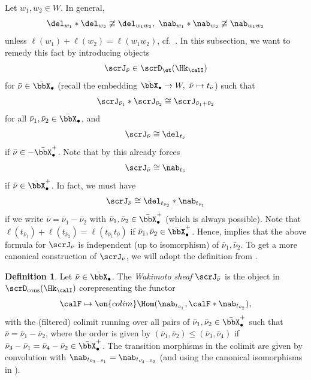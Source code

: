 \documentclass[10pt, reqno]{amsart}
\theoremstyle{plain}
\theoremstyle{definition}
\newtheorem{definition}[theorem]{Definition}
\numberwithin{equation}{section}
\begin{document}
	Let $w_1,w_2\in W$. In general,
	\begin{equation}
		\del_{w_1}\ast \del_{w_2}\ncong \del_{w_1w_2},\ \nab_{w_1}\ast \nab_{w_2}\ncong \nab_{w_1w_2}
	\end{equation}
	unless $\ell(w_1)+\ell(w_2)=\ell(w_1w_2)$, cf.\ . In this subsection, we want to remedy this fact by introducing objects
	\begin{equation}
		\scrJ_{\bar{\nu}}\in \scrD_{\et}(\Hk_{\calI})
	\end{equation}
	for $\bar{\nu}\in \bar{\bbX}_\bullet$ (recall the embedding $\bar{\bbX}_\bullet\to W,\ \bar{\nu}\mapsto t_{\bar{\nu}}$) such that
	\begin{equation}
		\scrJ_{\bar{\nu}_1}\ast \scrJ_{\bar{\nu}_2}\cong \scrJ_{\bar\nu_1+\bar\nu_2}
	\end{equation}
	for all $\bar\nu_1,\bar\nu_2\in \bar{\bbX}_\bullet$, and
	\begin{equation}
		\scrJ_{\bar{\nu}}\cong \del_{t_{\bar{\nu}}}
	\end{equation}
	if $\bar{\nu}\in -\bar{\bbX}_\bullet^+$. Note that by  this already forces
	\begin{equation}
		\scrJ_{\bar{\nu}}\cong \nab_{t_{\bar{\nu}}}
	\end{equation}
	if $\bar{\nu}\in \bar{\bbX}_\bullet^+$. In fact, we must have
	\begin{equation}
		\scrJ_{\bar{\nu}}\cong \del_{t_{\bar\nu_2}}\ast \nab_{t_{\bar\nu_1}}
	\end{equation}
	if we write $\bar{\nu}=\bar\nu_1-\bar\nu_2$ with $\bar\nu_1,\bar\nu_2\in \bar{\bbX}_\bullet^+$ (which is always possible).
	Note that $\ell(t_{\bar\nu_1})+\ell(t_{\bar\nu_2})=\ell(t_{\bar\nu_1}t_{\bar{\nu}})$ if $\bar\nu_1,\bar\nu_2\in \bar{\bbX}_\bullet^+$. Hence,  implies that the above formula for $\scrJ_{\bar{\nu}}$ is independent (up to isomorphism) of $\bar\nu_1,\bar\nu_2$.
	To get a more canonical construction of $\scrJ_{\bar{\nu}}$, we will adopt the definition from \cite[Section 4.2.1]{AR}.
	
	
	\begin{definition}
		\label{sec:wakim-funct-calj-1-definition-wakimoto-functor-for-nu}
		Let $\bar \nu\in \bar \bbX_\bullet$. The {\it Wakimoto sheaf }  $\scrJ_{\bar\nu} $ is the object in $\scrD_{\mathrm{cons}}(\Hk_\calI)$ corepresenting the functor
		\begin{equation}
			\calF \mapsto \on{colim}\Hom(\nab_{t_{\bar\nu_1}},\calF \ast \nab_{t_{\bar\nu_2}}),
		\end{equation}
		with the (filtered) colimit running over all pairs of $\bar{\nu}_1,\bar{\nu}_2 \in \bar \bbX_\bullet^+$ such that $\bar{\nu}=\bar{\nu}_1-\bar{\nu}_2$, where the order is given by $(\bar{\nu}_1,\bar{\nu}_2)\leq (\bar{\nu}_3,\bar{\nu}_4)$ if $\bar{\nu}_3-\bar{\nu}_1=\bar{\nu}_4-\bar{\nu}_2\in \bar \bbX_\bullet^+$. The transition morphisms in the colimit are given by convolution with $\nab_{t_{\bar{\nu}_3-\bar{\nu}_1}}=\nab_{t_{\bar{\nu_4}-\bar{\nu}_2}}$ (and using the canonical isomorphisms in  ).
	\end{definition}
	
\end{document}
